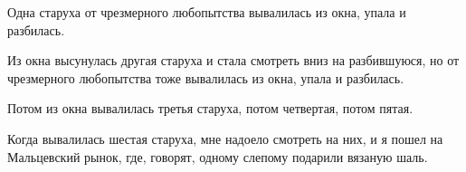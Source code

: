 Одна старуха от чрезмерного любопытства
вывалилась из окна, упала и разбилась.
    
Из окна высунулась другая старуха и стала
 смотреть вниз на разбившуюся, но от чрезмерного
 любопытства тоже вывалилась из окна,
упала и разбилась.
    
Потом из окна вывалилась третья старуха,
потом четвертая, потом пятая.
    
Когда вывалилась шестая старуха, мне надоело 
смотреть на них, и я пошел на Мальцевский 
рынок, где, говорят, одному слепому подарили 
вязаную шаль.